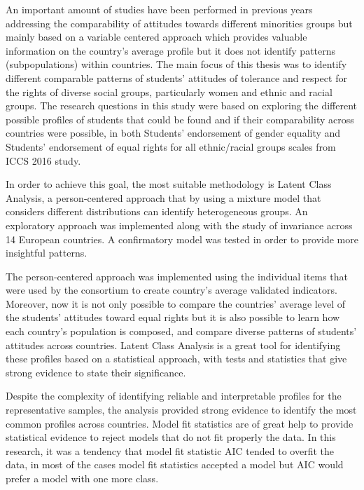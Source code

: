 \documentclass[12pt,a4paper,oneside]{reedthesis}
\begin{document}
An important amount of studies have been performed in previous years addressing the comparability of attitudes towards different minorities groups but mainly based on a variable centered approach which provides valuable information on the country's average profile but it does not identify patterns (subpopulations) within countries. The main focus of this thesis was to identify different comparable patterns of students' attitudes of tolerance and respect for the rights of diverse social groups, particularly women and ethnic and racial groups. The research questions in this study were based on exploring the different possible profiles of students that could be found and if their comparability across countries were possible, in both Students' endorsement of gender equality and Students' endorsement of equal rights for all ethnic/racial groups scales from ICCS 2016 study.

In order to achieve this goal, the most suitable methodology is Latent Class Analysis, a person-centered approach that by using a mixture model that considers different distributions can identify heterogeneous groups. An exploratory approach was implemented along with the study of invariance across 14 European countries. A confirmatory model was tested in order to provide more insightful patterns.

The person-centered approach was implemented using the individual items that were used by the consortium to create country's average validated indicators. Moreover, now it is not only possible to compare the countries' average level of the students' attitudes toward equal rights but it is also possible to learn how each country's population is composed, and compare diverse patterns of students' attitudes across countries. Latent Class Analysis is a great tool for identifying these profiles based on a statistical approach, with tests and statistics that give strong evidence to state their significance.

Despite the complexity of identifying reliable and interpretable profiles for the representative samples, the analysis provided strong evidence to identify the most common profiles across countries. Model fit statistics are of great help to provide statistical evidence to reject models that do not fit properly the data. In this research, it was a tendency that model fit statistic AIC tended to overfit the data, in most of the cases model fit statistics accepted a model but AIC would prefer a model with one more class.
\end{document}
